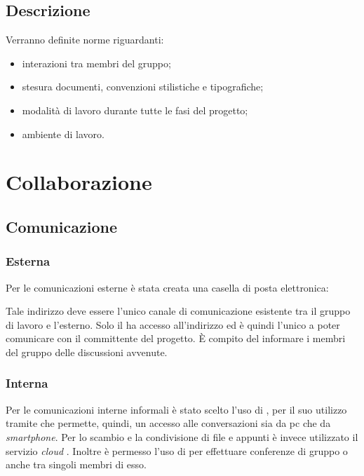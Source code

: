 \documentclass[12pt,a4paper]{article}
\begin{document}
\subsection{Descrizione}
Verranno definite norme riguardanti:
\begin{itemize}
  \item interazioni tra membri del gruppo;
  \item stesura documenti, convenzioni stilistiche e tipografiche;
  \item modalità di lavoro durante tutte le fasi del progetto;
  \item ambiente di lavoro.
\end{itemize}

\newpage

\section{Collaborazione}

\subsection{Comunicazione}
\subsubsection{Esterna}
Per le comunicazioni esterne è stata creata una casella di posta elettronica:
\begin{center}
	\href{mailto:\mailGruppo{}}{\mailGruppo{}}
\end{center}
Tale indirizzo deve essere l'unico canale di comunicazione esistente tra il gruppo di lavoro e l'esterno. Solo il \PM{} ha accesso all'indirizzo ed è quindi l'unico a poter comunicare con il committente del progetto. È compito del \PM{} informare i membri del gruppo delle discussioni avvenute.

\subsubsection{Interna}
Per le comunicazioni interne informali è stato scelto l'uso di \textit{}, per il suo utilizzo tramite \textit{} che permette, quindi, un accesso alle conversazioni sia da pc che da \textit{smartphone}. Per lo scambio e la condivisione di file e appunti è invece utilizzato il servizio \textit{cloud} . Inoltre è permesso l'uso di  per effettuare conferenze di gruppo o anche tra singoli membri di esso.
\end{document}

